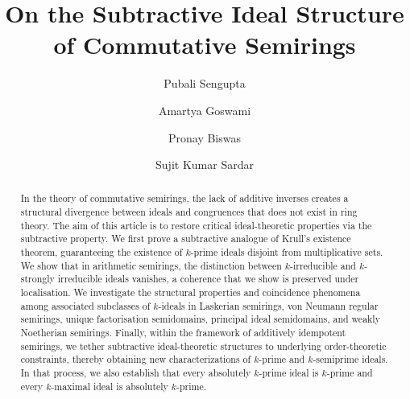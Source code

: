 \documentclass[11pt,english]{amsart}
\theoremstyle{definition}
\numberwithin{equation}{section}
\begin{document}
\author{Pubali Sengupta}
\address{
	Department of Mathematics, Jadavpur University, 188, Raja Subodh Chandra Mallick Rd,
	Jadavpur, Kolkata, West Bengal 700032, India.}
	
\author{Amartya Goswami}
\address{[1]  Department of Mathematics and Applied Mathematics, University of Johannesburg, P.O. Box 524, Auckland Park 2006, South Africa. [2]  National Institute for Theoretical and Computational Sciences (NITheCS), South Africa.}

\author{Pronay Biswas}

\address{Department of Mathematics, Jadavpur University, 188, Raja Subodh Chandra Mallick Rd,
	Jadavpur, Kolkata, West Bengal 700032, India}
	
\author{Sujit Kumar Sardar}
\address{Department of Mathematics, Jadavpur University, 188, Raja Subodh Chandra Mallick Rd,
Jadavpur, Kolkata, West Bengal 700032, India.}
	
\title{On the Subtractive Ideal Structure of Commutative Semirings}

\date{}




\begin{abstract}
In the theory of commutative semirings, the lack of additive inverses creates a structural divergence between ideals and congruences that does not exist in ring theory. The aim of this article is to  restore critical ideal-theoretic properties via the subtractive property. We first prove a subtractive analogue of Krull’s existence theorem, guaranteeing the existence of $k$-prime ideals disjoint from multiplicative sets. We show that in arithmetic semirings, the distinction between $k$-irreducible and $k$-strongly irreducible ideals vanishes, a coherence that we show is preserved under localisation. We investigate the structural properties and coincidence phenomena among associated subclasses of $k$-ideals in Laskerian semirings, von Neumann regular semirings, unique factorisation semidomains, principal ideal semidomains, and weakly Noetherian semirings. 
Finally, within the framework of additively idempotent semirings, we tether subtractive ideal-theoretic structures to underlying order-theoretic constraints, thereby obtaining new characterizations of $k$-prime and $k$-semiprime ideals. In that process, we also 
establish that every absolutely $k$-prime ideal is $k$-prime and every $k$-maximal ideal is absolutely $k$-prime.
\end{abstract}
\maketitle
\tableofcontents 
\end{document}
